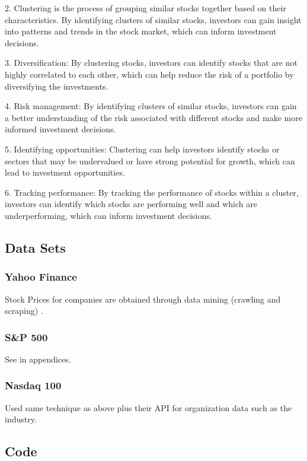 \documentclass[12pt]{article}
\begin{document}
2. Clustering is the process of grouping similar stocks together based on their characteristics. By identifying clusters of similar stocks, investors can gain insight into patterns and trends in the stock market, which can inform investment decisions. 

3. Diversification: By clustering stocks, investors can identify stocks that are not highly correlated to each other, which can help reduce the risk of a portfolio by diversifying the investments. 

4. Risk management: By identifying clusters of similar stocks, investors can gain a better understanding of the risk associated with different stocks and make more informed investment decisions.

5. Identifying opportunities: Clustering can help investors identify stocks or sectors that may be undervalued or have strong potential for growth, which can lead to investment opportunities.
 
6. Tracking performance: By tracking the performance of stocks within a cluster, investors can identify which stocks are performing well and which are underperforming, which can inform investment decisions. 

\subsection{Data Sets}

\subsubsection{Yahoo Finance}

Stock Prices for companies are obtained through data mining (crawling and scraping) \cite{yahooFinance}.

\subsubsection{S\&P 500}

See in appendices. \pageref{spcode}

\cite{sp500}

\subsubsection{Nasdaq 100}
Used same technique as above plus their API for organization data such as the industry. \cite{nasdaq}

\subsection{Code}
\end{document}
